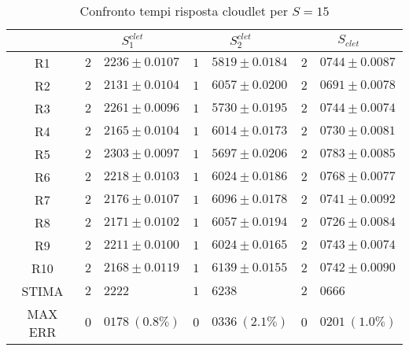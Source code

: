 \begin{table}[!h]
\begin{tabular}{c|r@{.}l|r@{.}l|r@{.}l}
& \multicolumn{2}{|c|}{$S_1^{clet}$}
& \multicolumn{2}{|c|}{$S_2^{clet}$}
& \multicolumn{2}{|c}{$S_{clet}$} 
\\          
\hline
R1      & $2$&$2236 \pm 0.0107$ & $1$&$5819 \pm 0.0184$ & $2$&$0744 \pm 0.0087$ \\
R2      & $2$&$2131 \pm 0.0104$ & $1$&$6057 \pm 0.0200$ & $2$&$0691 \pm 0.0078$ \\
R3      & $2$&$2261 \pm 0.0096$ & $1$&$5730 \pm 0.0195$ & $2$&$0744 \pm 0.0074$ \\
R4      & $2$&$2165 \pm 0.0104$ & $1$&$6014 \pm 0.0173$ & $2$&$0730 \pm 0.0081$ \\
R5      & $2$&$2303 \pm 0.0097$ & $1$&$5697 \pm 0.0206$ & $2$&$0783 \pm 0.0085$ \\
R6      & $2$&$2218 \pm 0.0103$ & $1$&$6024 \pm 0.0186$ & $2$&$0768 \pm 0.0077$ \\
R7      & $2$&$2176 \pm 0.0107$ & $1$&$6096 \pm 0.0178$ & $2$&$0741 \pm 0.0092$ \\
R8      & $2$&$2171 \pm 0.0102$ & $1$&$6057 \pm 0.0194$ & $2$&$0726 \pm 0.0084$ \\
R9      & $2$&$2211 \pm 0.0100$ & $1$&$6024 \pm 0.0165$ & $2$&$0743 \pm 0.0074$ \\
R10     & $2$&$2168 \pm 0.0119$ & $1$&$6139 \pm 0.0155$ & $2$&$0742 \pm 0.0090$ \\
STIMA   & $2$&$2222$            & $1$&$6238$            & $2$&$0666$            \\
MAX ERR & $0$&$0178 \ (0.8\%)$  & $0$&$0336 \ (2.1\%)$  & $0$&$0201 \ (1.0\%)$    
\end{tabular}
\centering
\caption{Confronto tempi risposta cloudlet per $S=15$}
\label{tab:15_sclet}
\end{table}
